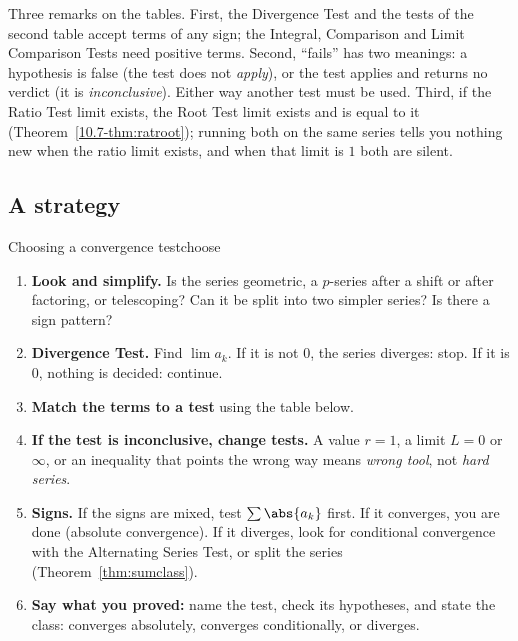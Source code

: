 \documentclass[11pt]{article}
\begin{document}
Three remarks on the tables. First, the Divergence Test and the tests of the second table accept terms of any sign; the Integral, Comparison and Limit Comparison Tests need positive terms. Second, ``fails'' has two meanings: a hypothesis is false (the test does not \emph{apply}), or the test applies and returns no verdict (it is \emph{inconclusive}). Either way another test must be used. Third, if the Ratio Test limit exists, the Root Test limit exists and is equal to it (Theorem~\ref{10.7-thm:ratroot}); running both on the same series tells you nothing new when the ratio limit exists, and when that limit is $1$ both are silent.

\subsection*{A strategy}

\begin{proc}{Choosing a convergence test}{choose}
\begin{enumerate}[nosep]
  \item \textbf{Look and simplify.} Is the series geometric, a $p$-series after a shift or after factoring, or telescoping? Can it be split into two simpler series? Is there a sign pattern?
  \item \textbf{Divergence Test.} Find $\lim a_k$. If it is not $0$, the series diverges: stop. If it is $0$, nothing is decided: continue.
  \item \textbf{Match the terms to a test} using the table below.
  \item \textbf{If the test is inconclusive, change tests.} A value $r=1$, a limit $L=0$ or $\infty$, or an inequality that points the wrong way means \emph{wrong tool}, not \emph{hard series}.
  \item \textbf{Signs.} If the signs are mixed, test $\sum\abs{a_k}$ first. If it converges, you are done (absolute convergence). If it diverges, look for conditional convergence with the Alternating Series Test, or split the series (Theorem~\ref{thm:sumclass}).
  \item \textbf{Say what you proved:} name the test, check its hypotheses, and state the class: converges absolutely, converges conditionally, or diverges.
\end{enumerate}
\end{proc}
\end{document}
